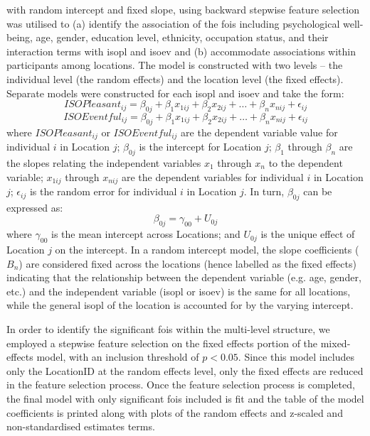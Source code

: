  with random intercept and fixed slope, using backward stepwise feature selection was utilised to (a) identify the association of the \glspl{foi} including psychological well-being, age, gender, education level, ethnicity, occupation status, and their interaction terms with \gls{isopl} and \gls{isoev} and (b) accommodate associations within participants among locations. The model is constructed with two levels -- the individual level (the random effects) and the location level (the fixed effects). Separate models were constructed for each \gls{isopl} and \gls{isoev} and take the form:
%
\begin{equation}
  \label{eqn:whoPl}
  ISOPleasant_{ij} = \beta_{0j} + \beta_1 x_{1ij} + \beta_2 x_{2ij} + \ldots + \beta_n x_{nij} + \epsilon_{ij}
\end{equation}
%
\begin{equation}
  \label{eqn:whoEv}
  ISOEventful_{ij} = \beta_{0j} + \beta_1 x_{1ij} + \beta_2 x_{2ij} + \ldots + \beta_n x_{nij} + \epsilon_{ij}
\end{equation}
%
where $ISOPleasant_{ij}$ or $ISOEventful_{ij}$ are the dependent variable value for individual $i$ in Location $j$; $\beta_{0j}$ is the intercept for Location $j$; $\beta_1$ through $\beta_n$ are the slopes relating the independent variables $x_1$ through $x_n$ to the dependent variable; $x_{1ij}$ through $x_{nij}$ are the dependent variables for individual $i$ in Location $j$; $\epsilon_{ij}$ is the random error for individual $i$ in Location $j$. In turn, $\beta_{0j}$ can be expressed as:
%
\begin{equation}
  \beta_{0j} = \gamma_{00} + U_{0j}
\end{equation}
%
where $\gamma_{00}$ is the mean intercept across Locations; and $U_{0j}$ is the unique effect of Location $j$ on the intercept. In a random intercept model, the slope coefficients ($B_n$) are considered fixed across the locations (hence labelled as the fixed effects) indicating that the relationship between the dependent variable (e.g. age, gender, etc.) and the independent variable (\gls{isopl} or \gls{isoev}) is the same for all locations, while the general \gls{isopl} of the location is accounted for by the varying intercept.

In order to identify the significant \glspl{foi} within the multi-level structure, we employed a stepwise feature selection on the fixed effects portion of the mixed-effects model, with an inclusion threshold of $p < 0.05$. Since this model includes only the LocationID at the random effects level, only the fixed effects are reduced in the feature selection process. Once the feature selection process is completed, the final model with only significant \glspl{foi} included is fit and the table of the model coefficients is printed along with plots of the random effects and z-scaled and non-standardised estimates terms.

